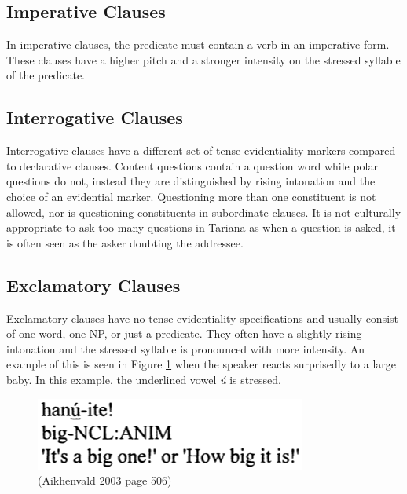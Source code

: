 \documentclass{article}
\begin{document}
\subsection{Imperative Clauses} \label{Imperative Clauses}
In imperative clauses, the predicate must contain a verb in an imperative form. These clauses have a higher pitch and a stronger intensity on the stressed syllable of the predicate.

\subsection{Interrogative Clauses} \label{Interrogative Clauses}
Interrogative clauses have a different set of tense-evidentiality markers compared to declarative clauses. %
Content questions contain a question word while polar questions do not, instead they are distinguished by rising intonation and the choice of an evidential marker. Questioning more than one constituent is not allowed, nor is questioning constituents in subordinate clauses. It is not culturally appropriate to ask too many questions in Tariana as when a question is asked, it is often seen as the asker doubting the addressee.

\subsection{Exclamatory Clauses} \label{Exclamatory Clauses}
Exclamatory clauses have no tense-evidentiality specifications and usually consist of one word, one NP, or just a predicate. They often have a slightly rising intonation and the stressed syllable is pronounced with more intensity. An example of this is seen in Figure \ref*{bigbaby} when the speaker reacts surprisedly to a large baby. In this example, the underlined vowel \emph{ú} is stressed.

\begin{figure}[h!]
\centering
\includegraphics[scale = 0.4]{bigbaby.png}
	\caption{(Aikhenvald 2003 page 506)}
	\label{bigbaby}
\end{figure}
\end{document}
